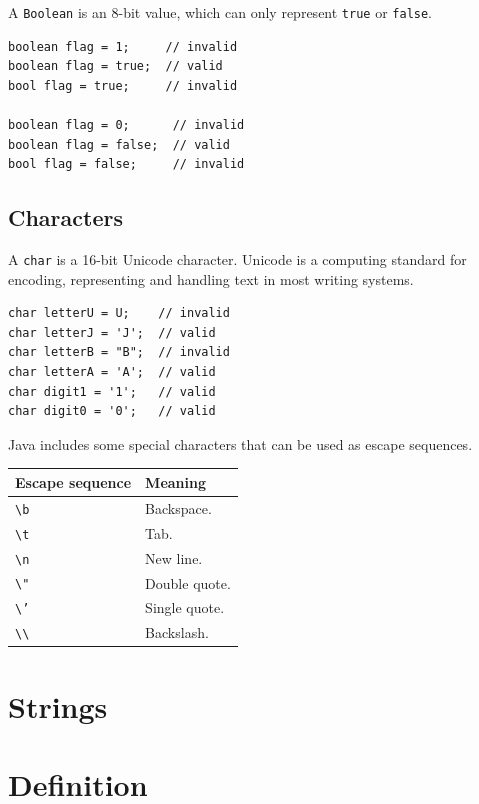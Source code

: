 \documentclass[a4paper]{systems-software}
\begin{document}
A \texttt{Boolean} is an 8-bit value, which can only represent \texttt{true} or \texttt{false}.

\begin{lstlisting}[title={Using the Boolean type.}]
boolean flag = 1;     // invalid
boolean flag = true;  // valid
bool flag = true;     // invalid

boolean flag = 0;      // invalid
boolean flag = false;  // valid
bool flag = false;     // invalid
\end{lstlisting}


\subsection*{Characters}

A \texttt{char} is a 16-bit Unicode character. Unicode is a computing standard for encoding, representing and handling text in most writing systems.

\begin{lstlisting}[title={Using the Boolean type.}]
char letterU = U;    // invalid
char letterJ = 'J';  // valid
char letterB = "B";  // invalid
char letterA = 'A';  // valid
char digit1 = '1';   // valid
char digit0 = '0';   // valid
\end{lstlisting}

Java includes some special characters that can be used as escape sequences.

\begin{longtabu} to \textwidth {| X[0.4,l] | X[1,l] |}
	\hline
	\textbf{Escape sequence} & \textbf{Meaning}
	\\ \hline
	\texttt{\textbackslash b} & Backspace.
	\\ \hline
	\texttt{\textbackslash t} & Tab.
	\\ \hline
	\texttt{\textbackslash n} & New line.
	\\ \hline
	\texttt{\textbackslash "} & Double quote.
	\\ \hline
	\texttt{\textbackslash '} & Single quote.
	\\ \hline
	\texttt{\textbackslash \textbackslash} & Backslash.
	\\ \hline
\end{longtabu}


\section{Strings}

\section*{Definition}
\end{document}
